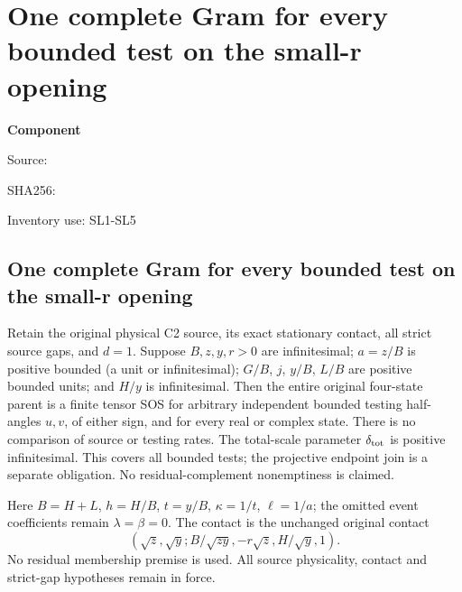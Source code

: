 \chapter{One complete Gram for every bounded test on the small-r opening}
\label{component:p99372d145f17}
\noindent\textbf{Component }\par
{\small\noindent Source: \par}
{\small\noindent SHA256: \par}
{\small\noindent Inventory use: SL1-SL5\par}
\medskip
\section{One complete Gram for every bounded test on the small-r opening}
\label{p99372d145f17:sec:r11-small-r-local}

\begin{theorem}
Retain the original physical C2 source, its exact stationary contact,
all strict source gaps, and $d=1$. Suppose $B,z,y,r>0$ are
infinitesimal; $a=z/B$ is positive bounded (a unit or infinitesimal);
$G/B$, $j$, $y/B$, $L/B$ are positive bounded units; and $H/y$
is infinitesimal.
Then the entire original four-state parent is a finite tensor SOS
for arbitrary independent bounded testing half-angles $u,v$, of either sign, and for every real or complex state.
There is no comparison of source or testing rates.
The total-scale parameter $\delta_{\rm tot}$ is positive infinitesimal.
This covers all bounded tests; the projective endpoint join is a
separate obligation. No residual-complement nonemptiness is claimed.
\end{theorem}

Here $B=H+L$, $h=H/B$, $t=y/B$, $\kappa=1/t$, $\ell=1/a$;
the omitted event coefficients remain $\lambda=\beta=0$.
The contact is the unchanged original contact
\[
 (\sqrt z,\sqrt y;B/\sqrt{zy},-r\sqrt z,H/\sqrt y,1).
\]
No residual membership premise is used. All source physicality,
contact and strict-gap hypotheses remain in force.

